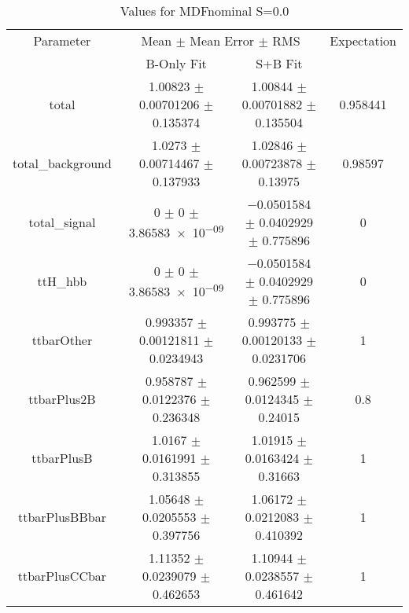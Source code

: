 \begin{table}
\centering
\caption{Values for MDFnominal S=0.0}
\begin{tabular}{cccc}
\toprule
Parameter & \multicolumn{2}{c}{Mean $\pm$ Mean Error $\pm$ RMS} & Expectation\\
 & B-Only Fit & S+B Fit & \\
\midrule
total & \num{1.00823} $\pm$ \num{0.00701206} $\pm$ \num{0.135374} & \num{1.00844} $\pm$ \num{0.00701882} $\pm$ \num{0.135504} & \num{0.958441}\\
total\_background & \num{1.0273} $\pm$ \num{0.00714467} $\pm$ \num{0.137933} & \num{1.02846} $\pm$ \num{0.00723878} $\pm$ \num{0.13975} & \num{0.98597}\\
total\_signal & \num{0} $\pm$ \num{0} $\pm$ \num{3.86583e-09} & \num{-0.0501584} $\pm$ \num{0.0402929} $\pm$ \num{0.775896} & \num{0}\\
ttH\_hbb & \num{0} $\pm$ \num{0} $\pm$ \num{3.86583e-09} & \num{-0.0501584} $\pm$ \num{0.0402929} $\pm$ \num{0.775896} & \num{0}\\
ttbarOther & \num{0.993357} $\pm$ \num{0.00121811} $\pm$ \num{0.0234943} & \num{0.993775} $\pm$ \num{0.00120133} $\pm$ \num{0.0231706} & \num{1}\\
ttbarPlus2B & \num{0.958787} $\pm$ \num{0.0122376} $\pm$ \num{0.236348} & \num{0.962599} $\pm$ \num{0.0124345} $\pm$ \num{0.24015} & \num{0.8}\\
ttbarPlusB & \num{1.0167} $\pm$ \num{0.0161991} $\pm$ \num{0.313855} & \num{1.01915} $\pm$ \num{0.0163424} $\pm$ \num{0.31663} & \num{1}\\
ttbarPlusBBbar & \num{1.05648} $\pm$ \num{0.0205553} $\pm$ \num{0.397756} & \num{1.06172} $\pm$ \num{0.0212083} $\pm$ \num{0.410392} & \num{1}\\
ttbarPlusCCbar & \num{1.11352} $\pm$ \num{0.0239079} $\pm$ \num{0.462653} & \num{1.10944} $\pm$ \num{0.0238557} $\pm$ \num{0.461642} & \num{1}\\
\bottomrule
\end{tabular}
\end{table}